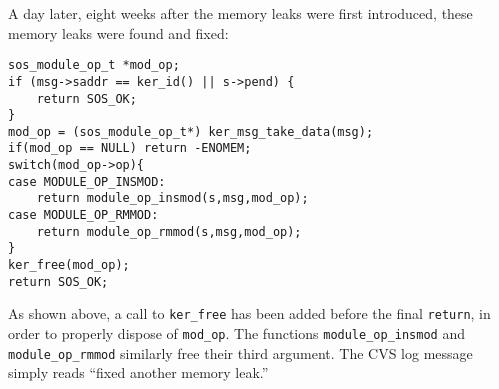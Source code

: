 A day later, eight weeks after the memory leaks were first introduced,
these memory leaks were found and fixed:

\begin{footnotesize}
\begin{verbatim}
sos_module_op_t *mod_op;
if (msg->saddr == ker_id() || s->pend) {
    return SOS_OK;
}
mod_op = (sos_module_op_t*) ker_msg_take_data(msg);
if(mod_op == NULL) return -ENOMEM;
switch(mod_op->op){
case MODULE_OP_INSMOD:
    return module_op_insmod(s,msg,mod_op);
case MODULE_OP_RMMOD:
    return module_op_rmmod(s,msg,mod_op);
}
ker_free(mod_op);
return SOS_OK;
\end{verbatim}
\end{footnotesize}

As shown above, a call to {\tt ker\_free} has been added before the
final {\tt return}, in order to properly dispose of {\tt mod\_op}.
The functions {\tt module\_op\_insmod} and {\tt module\_op\_rmmod}
similarly free their third argument.  The CVS log message simply reads
``fixed another memory leak.''





